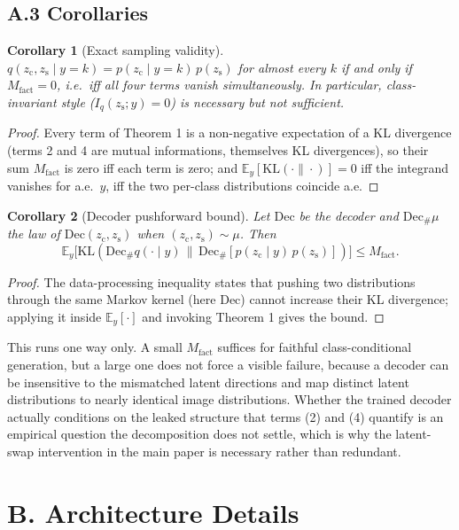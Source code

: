 \documentclass[letterpaper]{article} %
\newtheorem{corollary}{Corollary}
\newcommand{\zc}{z_{\mathrm{c}}}
\newcommand{\zs}{z_{\mathrm{s}}}
\newcommand{\KL}{\mathrm{KL}}
\begin{document}
\subsection{A.3 Corollaries}

\begin{corollary}[Exact sampling validity]
$q(\zc,\zs\mid y{=}k)=p(\zc\mid y{=}k)\,p(\zs)$ for almost every $k$ if and
only if $M_{\mathrm{fact}}=0$, i.e.\ iff all four terms vanish
simultaneously. In particular, class-invariant style ($I_q(\zs;y)=0$) is
necessary but not sufficient.
\end{corollary}

\begin{proof}
Every term of Theorem 1 is a non-negative expectation of a KL divergence
(terms 2 and 4 are mutual informations, themselves KL divergences), so their
sum $M_{\mathrm{fact}}$ is zero iff each term is zero; and $\mathbb
E_y[\KL(\cdot\|\cdot)]=0$ iff the integrand vanishes for a.e.\ $y$, iff the
two per-class distributions coincide a.e.
\end{proof}

\begin{corollary}[Decoder pushforward bound]
Let $\mathrm{Dec}$ be the decoder and $\mathrm{Dec}_\#\mu$ the law of
$\mathrm{Dec}(\zc,\zs)$ when $(\zc,\zs)\sim\mu$. Then
\[
\mathbb E_y\bigl[\KL(\mathrm{Dec}_\# q(\cdot\mid y)\,\|\,\mathrm{Dec}_\#[p(\zc\mid y)\,p(\zs)])\bigr] \le M_{\mathrm{fact}}.
\]
\end{corollary}

\begin{proof}
The data-processing inequality states that pushing two distributions through
the same Markov kernel (here $\mathrm{Dec}$) cannot increase their KL
divergence; applying it inside $\mathbb E_y[\cdot]$ and invoking Theorem 1
gives the bound.
\end{proof}

This runs one way only. A small $M_{\mathrm{fact}}$ suffices for faithful
class-conditional generation, but a large one does not force a visible
failure, because a decoder can be insensitive to the mismatched latent
directions and map distinct latent distributions to nearly identical image
distributions. Whether the trained decoder actually conditions on the leaked
structure that terms (2) and (4) quantify is an empirical question the
decomposition does not settle, which is why the latent-swap intervention in
the main paper is necessary rather than redundant.

\section{B. Architecture Details}
\end{document}
